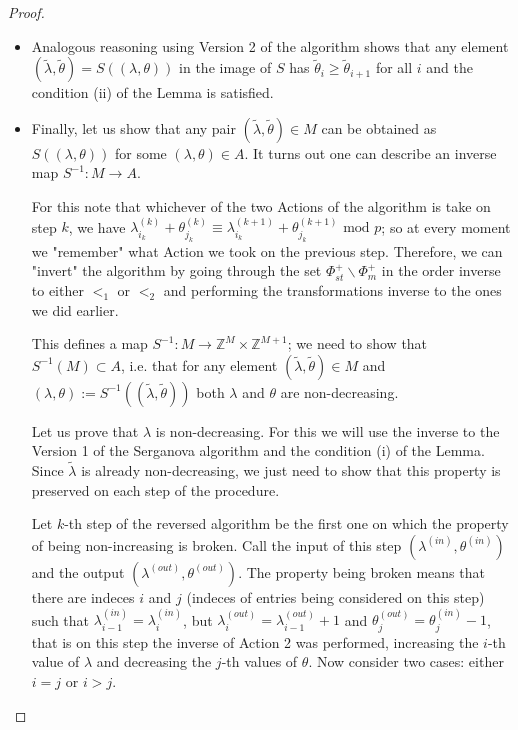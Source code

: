 \documentclass[10pt,a4paper]{amsart}
\begin{document}
\begin{proof}
\begin{itemize}
        
        \item Analogous reasoning using Version 2 of the algorithm shows that any element $(\tilde\lambda,\tilde\theta)=S\left( (\lambda,\theta)\right)$ in the image of $S$ has $\tilde\theta_{i} \ge \tilde\theta_{i+1}$ for all $i$  and the condition (ii) of the Lemma is satisfied.

        \item Finally, let us show that any pair $(\tilde\lambda,\tilde\theta) \in M$ can be obtained as $S((\lambda,\theta))$ for some $(\lambda,\theta) \in A$. It turns out one can describe an inverse map $S^{-1}:M\to A$.

        For this note that whichever of the two Actions of the algorithm is take on step $k$, we have $\lambda^{(k)}_{i_k}+\theta^{(k)}_{j_k} \equiv \lambda^{(k+1)}_{i_k}+\theta^{(k+1)}_{j_k} \text{ mod }p$; so at every moment we "remember" what Action we took on the previous step. Therefore, we can "invert" the algorithm by going through the set $\Phi^+_{st}\backslash \Phi^+_m$ in the order inverse to either $<_1$ or $<_2$ and performing the transformations inverse to the ones we did earlier.

        This defines a map $S^{-1}:M \to \mathbb{Z}^M\times\mathbb{Z}^{M+1}$; we need to show that $S^{-1}(M)\subset A$, i.e. that for any element $(\tilde\lambda,\tilde\theta)\in M$ and $(\lambda,\theta):=S^{-1}((\tilde\lambda,\tilde\theta))$ both $\lambda$ and $\theta$ are non-decreasing.

        Let us prove that $\lambda$ is non-decreasing.  For this we will use the inverse to the Version 1 of the Serganova algorithm and the condition (i) of the Lemma. Since $\tilde\lambda$ is already non-decreasing, we just need to show that this property is preserved on each step of the procedure. 

        Let $k$-th step of the reversed algorithm be the first one on which the property of being non-increasing is broken. Call the input of this step $(\lambda^{(in)},\theta^{(in)})$ and the output $(\lambda^{(out)},\theta^{(out)})$. The property being broken means that there are indeces $i$ and $j$ (indeces of entries being considered on this step) such that  $\lambda^{(in)}_{i-1}=\lambda^{(in)}_{i}$, but $\lambda^{(out)}_i= \lambda^{(out)}_{i-1}+1$ and $\theta^{(out)}_j = \theta^{(in)}_j-1$, that is on this step the inverse of Action 2 was performed, increasing the $i$-th value of $\lambda$ and decreasing the $j$-th values of $\theta$. Now consider two cases: either $i=j$ or $i>j$. 


\end{itemize}
\end{proof}
\end{document}
